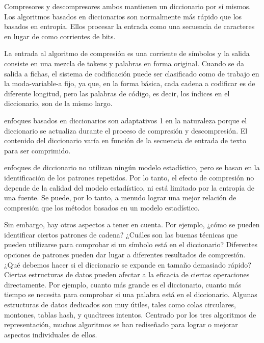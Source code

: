 Compresores y descompresores ambos mantienen un diccionario por sí mismos. Los algoritmos basados en diccionarios son normalmente más rápido que los basados en entropía. Ellos procesar la entrada como una secuencia de caracteres en lugar de como corrientes de bits.



La entrada al algoritmo de compresión es una corriente de símbolos y la salida consiste en una mezcla de tokens y palabras en forma original. Cuando se da salida a fichas, el sistema de codificación puede ser clasificado como de trabajo en la moda-variable-a fijo, ya que, en la forma básica, cada cadena a codificar es de diferente longitud, pero las palabras de código, es decir, los índices en el diccionario, son de la mismo largo.




enfoques basados en diccionarios son adaptativos 1 en la naturaleza porque el diccionario se actualiza durante el proceso de compresión y descompresión. El contenido del diccionario varía en función de la secuencia de entrada de texto para ser comprimido.




enfoques de diccionario no utilizan ningún modelo estadístico, pero se basan en la identificación de los patrones repetidos. Por lo tanto, el efecto de compresión no depende de la calidad del modelo estadístico, ni está limitado por la entropía de una fuente. Se puede, por lo tanto, a menudo lograr una mejor relación de compresión que los métodos basados en un modelo estadístico.



Sin embargo, hay otros aspectos a tener en cuenta. Por ejemplo, ¿cómo se pueden identificar ciertos patrones de cadena? ¿Cuáles son las buenas técnicas que pueden utilizarse para comprobar si un símbolo está en el diccionario? Diferentes opciones de patrones pueden dar lugar a diferentes resultados de compresión. ¿Qué debemos hacer si el diccionario se expande en tamaño demasiado rápido? Ciertas estructuras de datos pueden afectar a la eficacia de ciertas operaciones directamente. Por ejemplo, cuanto más grande es el diccionario, cuanto más tiempo se necesita para comprobar si una palabra está en el diccionario. Algunas estructuras de datos dedicados son muy útiles, tales como colas circulares, montones, tablas hash, y quadtrees intentos. Centrado por los tres algoritmos de representación, muchos algoritmos se han rediseñado para lograr o mejorar aspectos individuales de ellos.



